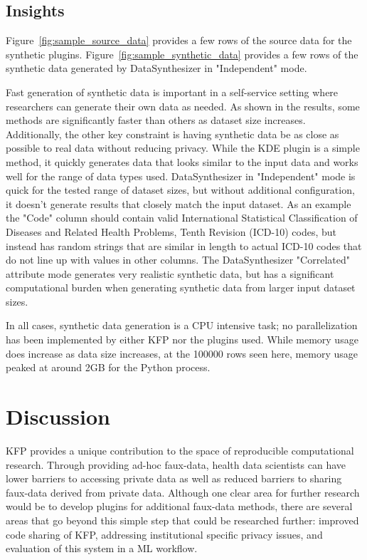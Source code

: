 \documentclass{amia}
\begin{document}
\subsection{Insights}

Figure~\ref{fig:sample_source_data} provides a few rows of the source data for the synthetic plugins. Figure~\ref{fig:sample_synthetic_data} provides a few rows of the synthetic data generated by DataSynthesizer in "Independent" mode.

Fast generation of synthetic data is important in a self-service setting where researchers can generate their own data as needed. As shown in the results, some methods are significantly faster than others as dataset size increases. Additionally, the other key constraint is having synthetic data be as close as possible to real data without reducing privacy.  While the KDE plugin is a simple method, it quickly generates data that looks similar to the input data and works well for the range of data types used. DataSynthesizer in "Independent" mode is quick for the tested range of dataset sizes, but without additional configuration, it doesn't generate results that closely match the input dataset. As an example the "Code" column should contain valid International Statistical Classification of Diseases and Related Health Problems, Tenth Revision (ICD-10) codes, but instead has random strings that are similar in length to actual ICD-10 codes that do not line up with values in other columns. The DataSynthesizer "Correlated" attribute mode generates very realistic synthetic data, but has a significant computational burden when generating synthetic data from larger input dataset sizes.

In all cases, synthetic data generation is a CPU intensive task; no parallelization has been implemented by either KFP nor the plugins used. While memory usage does increase as data size increases, at the 100000 rows seen here, memory usage peaked at around 2GB for the Python process.

\section{Discussion}

KFP provides a unique contribution to the space of reproducible computational research. Through providing ad-hoc faux-data, health data scientists can have lower barriers to accessing private data as well as reduced barriers to sharing faux-data derived from private data. Although one clear area for further research would be to develop plugins for additional faux-data methods, there are several areas that go beyond this simple step that could be researched further: improved code sharing of KFP, addressing institutional specific privacy issues, and evaluation of this system in a ML workflow.
\end{document}
